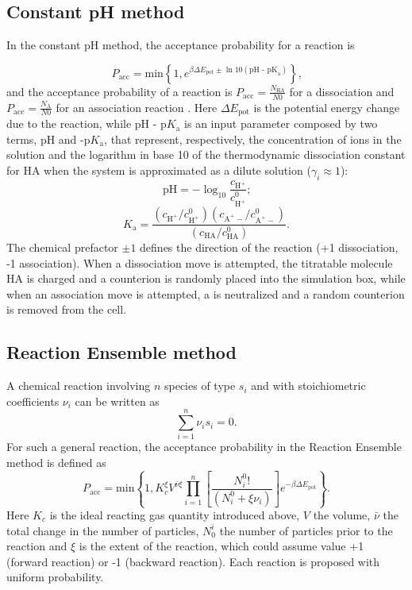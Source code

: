 \documentclass[
a4paper,                        %
11pt,                           %
twoside,                        %
footsepline,                    %
headsepline,                    %
headexclude,                    %
footexclude,                    %
pagesize,                       %
]{scrartcl}
\begin{document}
\subsection{Constant pH method}

In the constant pH method, the acceptance probability for a reaction is

\begin{equation} 
P_{\text{acc}} = \text{min}\left\lbrace  1, e^{\beta \Delta E_\text{pot} \pm \ln{10} (\text{pH - pK}_\text{a})}\right\rbrace \text{,}
\end{equation}
and the acceptance probability of a reaction is $P_\text{acc}=\frac{N_\text{HA}}{N0}$ for a dissociation and $P_\text{acc}=\frac{N_\text{A}}{N0}$ for an association reaction \cite{landsgesell2017simulation}. Here $\Delta E_\text{pot}$ is the potential energy change due to the reaction, while $\text{pH - p}K_\text{a}$ is an input parameter composed by two terms, pH and -p$K_\text{a}$, that represent, respectively, the concentration of  ions in the solution and the logarithm in base 10 of the thermodynamic dissociation constant for HA when the system is approximated as a dilute solution ($\gamma_i \approx 1$):
\begin{equation} 
\text{pH} = -\log_{10} \frac{c_{\text{H}^+}}{c_{\text{H}^+}^0}\text{;}
\end{equation}
\begin{equation} 
K_\text{a} = \frac{(c_{\text{H}^+}/c_{\text{H}^+}^0)(c_{\text{A}^+-}/c_{\text{A}^+-}^0)}{(c_{\text{HA}}/c_{\text{HA}}^0)} \text{.}
\end{equation}
The chemical prefactor $\pm 1$ defines the direction of the reaction (+1 dissociation, -1 association).
When a dissociation move is attempted, the titratable molecule HA is charged and a counterion  is randomly placed into the simulation box, while when an association move is attempted, a  is neutralized and a random counterion  is removed from the cell.


\subsection{Reaction Ensemble method}
A chemical reaction involving ${n}$ species of type ${s_i}$ and with stoichiometric coefficients $\nu_i$ can be written as 
\begin{equation}
\sum_{i = 1}^n \nu_{i} s_i = 0\text{.}
\end{equation}
For such a general reaction, the acceptance probability in the Reaction Ensemble method is defined as
\begin{equation}\label{RE}
P_{\text{acc}} = \text{min} \left\lbrace 1, K_{c}^\xi V^{\bar{\nu}\xi} \prod_{i = 1}^{n} \left[ \frac{N_{i}^0!}{(N_{i}^{0} + \xi \nu_i)}  \right] e^{-\beta \Delta E_\text{pot}}  \right\rbrace\text{.}
\end{equation}
Here $K_c$ is the ideal reacting gas quantity introduced above, $V$ the volume, $\bar{\nu}$ the total change in the number of particles, $N_0^i$ the number of particles prior to the reaction and $\xi$ is the extent of the reaction, which could assume value +1 (forward reaction) or -1 (backward reaction). Each reaction is proposed with uniform probability. 
\end{document}
